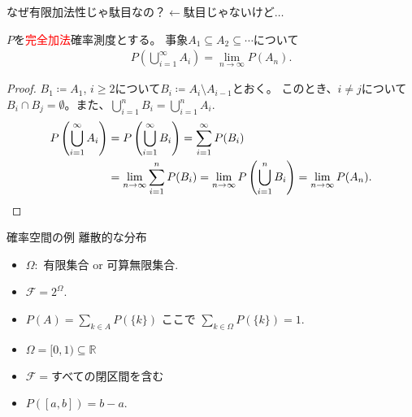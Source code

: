 \documentclass[lualatex,handout]{beamer}
\newcommand{\emm}[1]{\textcolor{red}{#1}}
\theoremstyle{definition}
\begin{document}
\begin{frame}{なぜ有限加法性じゃ駄目なの？$\leftarrow$駄目じゃないけど$\dotsc$}
\begin{theorem}[確率測度の連続性]
$P$を\emm{完全加法}確率測度とする。
事象$A_1\subseteq A_2\subseteq \dotsb$について
\begin{align*}
P\left(\bigcup_{i=1}^\infty A_i\right) = \lim_{n\to\infty} P(A_n).
\end{align*}
\end{theorem}
\begin{proof}
$B_1\coloneq A_1$, $i\ge 2$について$B_i\coloneq A_i\setminus A_{i-1}$とおく。
このとき、$i\ne j$について $B_i\cap B_j=\emptyset$。また、$\bigcup_{i=1}^n B_i = \bigcup_{i=1}^nA_i$.
\begin{align*}
P\left(\bigcup_{i=1}^\infty A_i\right)&= P\left(\bigcup_{i=1}^\infty B_i\right) =\sum_{i=1}^\infty P(B_i)\\
&=\lim_{n\to\infty} \sum_{i=1}^n P(B_i)
=\lim_{n\to\infty} P\left(\bigcup_{i=1}^n B_i\right)
=\lim_{n\to\infty} P(A_n).\qedhere
\end{align*}
\end{proof}
\end{frame}

\begin{frame}{確率空間の例}
離散的な分布
\begin{itemize}
\item $\Omega\colon$ 有限集合 or 可算無限集合.
\item $\mathcal{F} = 2^\Omega$.
\item $P(A) = \sum_{k\in A} P(\{k\})$ ここで $\sum_{k\in\Omega} P(\{k\})=1$.
\end{itemize}

\vspace{1em}
\begin{itemize}
\item $\Omega=[0,1)\subseteq\mathbb{R}$
\item $\mathcal{F} = $すべての閉区間を含む
\item $P([a,b]) = b-a$.
\end{itemize}

\end{frame}
\end{document}
